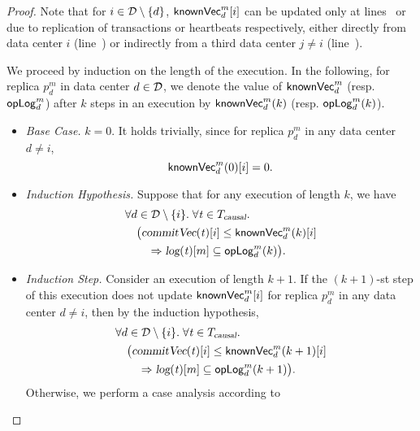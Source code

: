 \begin{proof} \label{proof:replication-knownvc}
  Note that for $i \in \mathcal{D} \setminus \{d\}$,
  ${\sf knownVec}^{m}_{d}[i]$ can be updated
  only at lines~\code{\ref{alg:unistore-replication}}{\ref{line:replicate-knownvc}}
  or \code{\ref{alg:unistore-replication}}{\ref{line:heartbeat-knownvc}}
  due to replication of transactions or heartbeats respectively,
  either directly from data center $i$
  (line~\code{\ref{alg:unistore-replication}}{\ref{line:function-propagate}})
  or indirectly from a third data center $j \neq i$
  (line~\code{\ref{alg:unistore-replication}}{\ref{line:function-forward}}).

  We proceed by induction on the length of the execution.
  In the following, for replica $p^{m}_{d}$ in data center $d \in \mathcal{D}$,
  we denote the value of ${\sf knownVec}^{m}_{d}$ (resp. ${\sf opLog}^{m}_{d}$)
  after $k$ steps in an execution
  by ${\sf knownVec}^{m}_{d}(k)$ (resp. ${\sf opLog}^{m}_{d}(k)$).
  \begin{itemize}
    \item \emph{Base Case.} $k = 0$.
      It holds trivially,
      since for replica $p^{m}_{d}$ in any data center $d \neq i$,
      \[
        {\sf knownVec}^{m}_{d}(0)[i] = 0.
      \]
    \item \emph{Induction Hypothesis.}
      Suppose that for any execution of length $k$, we have
      \begin{align*}
        &\forall d \in \D \setminus \set{i}.\;
          \forall \tvar \in \causaltxs.\; \\
            &\quad \big(\commitVC(\tvar)[i] \le \knownVC^{m}_{d}(k)[i] \\
            &\quad\quad \implies \log(\tvar)[m] \subseteq \oplog^{m}_{d}(k)\big).
      \end{align*}
    \item \emph{Induction Step.}
      Consider an execution of length $k + 1$.
      If the $(k+1)$-st step of this execution does not update
      ${\sf knownVec}^{m}_{d}[i]$ for replica $p^{m}_{d}$ in any data center $d \neq i$,
      then by the induction hypothesis,
      \begin{align*}
        &\forall d \in \D \setminus \set{i}.\;
          \forall \tvar \in \causaltxs.\; \\
            &\quad \big(\commitVC(\tvar)[i] \le \knownVC^{m}_{d}(k+1)[i] \\
            &\quad\quad \implies \log(\tvar)[m] \subseteq \oplog^{m}_{d}(k+1)\big).
      \end{align*}
      Otherwise, we perform a case analysis according to

\end{itemize}
\end{proof}
